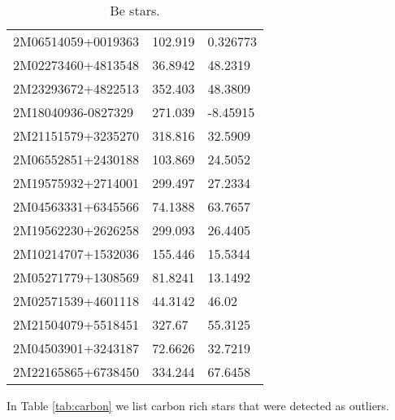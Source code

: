 \documentclass[fleqn,usenatbib]{mnras}
\begin{document}
\begin{table*}
\begin{tabular}{lll}
  2M06514059+0019363 &  102.919 &  0.326773 \\
  2M02273460+4813548 &  36.8942 &   48.2319 \\
  2M23293672+4822513 &  352.403 &   48.3809 \\
  2M18040936-0827329 &  271.039 &  -8.45915 \\
  2M21151579+3235270 &  318.816 &   32.5909 \\
  2M06552851+2430188 &  103.869 &   24.5052 \\
  2M19575932+2714001 &  299.497 &   27.2334 \\
  2M04563331+6345566 &  74.1388 &   63.7657 \\
  2M19562230+2626258 &  299.093 &   26.4405 \\
  2M10214707+1532036 &  155.446 &   15.5344 \\
  2M05271779+1308569 &  81.8241 &   13.1492 \\
  2M02571539+4601118 &  44.3142 &     46.02 \\
  2M21504079+5518451 &   327.67 &   55.3125 \\
  2M04503901+3243187 &  72.6626 &   32.7219 \\
  2M22165865+6738450 &  334.244 &   67.6458 \\
  \bottomrule
  \end{tabular}
  \caption{Be stars.}
  \label{tab:new_be_stars}
\end{table*}

In Table \ref{tab:carbon} we list carbon rich stars that were detected as outliers.
\end{document}

